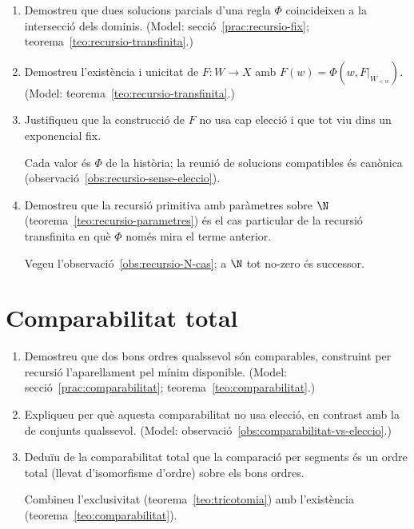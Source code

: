 \begin{enumerate}[resume]
  \item Demostreu que dues solucions parcials d'una regla \(\Phi\) coincideixen a la intersecció dels dominis. (Model: secció~\ref{prac:recursio-fix}; teorema~\ref{teo:recursio-transfinita}.)

  \item Demostreu l'existència i unicitat de \(F\colon W\to X\) amb \(F(w)=\Phi(w,F|_{W_{<w}})\). (Model: teorema~\ref{teo:recursio-transfinita}.)

  \item Justifiqueu que la construcció de \(F\) no usa cap elecció i que tot viu dins un exponencial fix. \begin{indicacio}Cada valor és \(\Phi\) de la història; la reunió de solucions compatibles és canònica (observació~\ref{obs:recursio-sense-eleccio}).\end{indicacio}

  \item Demostreu que la recursió primitiva amb paràmetres sobre \(\N\) (teorema~\ref{teo:recursio-parametres}) és el cas particular de la recursió transfinita en què \(\Phi\) només mira el terme anterior. \begin{indicacio}Vegeu l'observació~\ref{obs:recursio-N-cas}; a \(\N\) tot no-zero és successor.\end{indicacio}
\end{enumerate}

\section{Comparabilitat total}

\begin{enumerate}[resume]
  \item Demostreu que dos bons ordres qualssevol són comparables, construint per recursió l'aparellament pel mínim disponible. (Model: secció~\ref{prac:comparabilitat}; teorema~\ref{teo:comparabilitat}.)

  \item Expliqueu per què aquesta comparabilitat no usa elecció, en contrast amb la de conjunts qualssevol. (Model: observació~\ref{obs:comparabilitat-vs-eleccio}.)

  \item Deduïu de la comparabilitat total que la comparació per segments és un ordre total (llevat d'isomorfisme d'ordre) sobre els bons ordres. \begin{indicacio}Combineu l'exclusivitat (teorema~\ref{teo:tricotomia}) amb l'existència (teorema~\ref{teo:comparabilitat}).\end{indicacio}
\end{enumerate}


